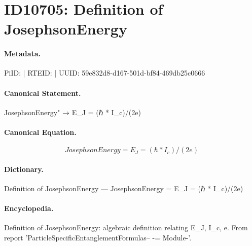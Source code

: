 \section*{ID10705: Definition of JosephsonEnergy}
\paragraph{Metadata.}
PiID:  | RTEID:  | UUID: 59e832d8-d167-501d-bf84-469db25c0666

\paragraph{Canonical Statement.}
JosephsonEnergy" → E\_J = (ℏ * I\_c)/(2e)

\paragraph{Canonical Equation.}
\[
JosephsonEnergy = E_J = (ℏ * I_c)/(2e)
\]

\paragraph{Dictionary.}
Definition of JosephsonEnergy — JosephsonEnergy = E\_J = (ℏ * I\_c)/(2e)

\paragraph{Encyclopedia.}
Definition of JosephsonEnergy: algebraic definition relating E\_J, I\_c, e. From report 'ParticleSpecificEntanglementFormulas-- -= Module-'.
